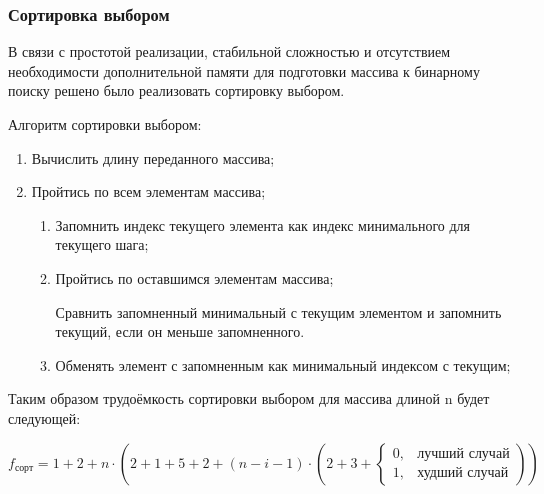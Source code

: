 \subsubsection*{Сортировка выбором}

\hspace{1.25cm}
В связи с простотой реализации, стабильной сложностью и отсутствием необходимости дополнительной памяти для подготовки массива к бинарному поиску решено было реализовать сортировку выбором.

Алгоритм сортировки выбором:

\begin{enumerate}

\item Вычислить длину переданного массива;

\item Пройтись по всем элементам массива;

\begin{enumerate}

\item Запомнить индекс текущего элемента как индекс минимального для текущего шага;

\item Пройтись по оставшимся элементам массива;

Сравнить запомненный минимальный с текущим элементом и запомнить текущий, если он меньше запомненного.

\item Обменять элемент с запомненным как минимальный индексом с текущим;

\end{enumerate}

\end{enumerate}

Таким образом трудоёмкость сортировки выбором для массива длиной n будет следующей:

\begin{equation}
f_{\text{сорт}} = 1 + 2 + n \cdot \left(2 + 1 + 5 + 2 + (n - i - 1) \cdot \left(2 + 3 + \left\{\begin{array}{ll}
0, & \text{лучший случай} \\
1, & \text{худший случай}
\end{array}\right.\right)\right)
\end{equation}

\newpage